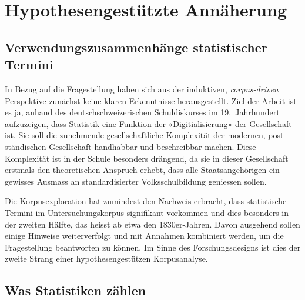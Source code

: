 


\chapter{Hypothesengestützte Annäherung} %

\label{Chapter5} %

\section{Verwendungszusammenhänge statistischer Termini}
In Bezug auf die Fragestellung haben sich aus der induktiven, \textit{corpus-driven} Perspektive zunächst keine klaren Erkenntnisse herausgestellt. Ziel der Arbeit ist es ja, anhand des deutschschweizerischen Schuldiskurses im 19.~Jahrhundert aufzuzeigen, dass Statistik eine Funktion der «Digitialisierung» der Gesellschaft ist. Sie soll die zunehmende gesellschaftliche Komplexität der modernen, post-ständischen Gesellschaft handhabbar und beschreibbar machen. Diese Komplexität ist in der Schule besonders drängend, da sie in dieser Gesellschaft erstmals den theoretischen Anspruch erhebt, dass alle Staatsangehörigen ein gewisses Ausmass an standardisierter Volksschulbildung geniessen sollen. 

Die Korpusexploration hat zumindest den Nachweis erbracht, dass statistische Termini im Untersuchungskorpus signifikant vorkommen und dies besonders in der zweiten Hälfte, das heisst ab etwa den 1830er-Jahren. Davon ausgehend sollen einige Hinweise weiterverfolgt und mit Annahmen kombiniert werden, um die Fragestellung beantworten zu können. Im Sinne des Forschungsdesigns ist dies der zweite Strang einer hypothesengestützen Korpusanalyse.

\section{Was Statistiken zählen}


